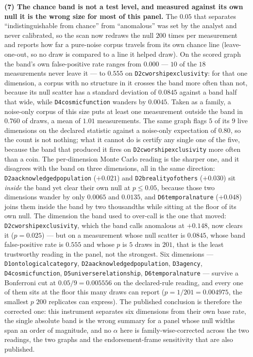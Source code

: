 \documentclass[11pt]{article}
\DeclareRobustCommand{\_}{\textunderscore\allowbreak}
\newcommand{\dimkey}[1]{\texttt{\small #1}}
\begin{document}
\textbf{(7) The chance band is not a test level, and measured against its own null it is the
wrong size for most of this panel.} The \(0.05\) that separates ``indistinguishable from
chance'' from ``anomalous'' was set by the analyst and never calibrated, so the scan now
redraws the null \(200\) times per measurement and reports how far a pure-noise corpus
travels from its own chance line (leave-one-out, so no draw is compared to a line it helped
draw). On the scored graph the band's own false-positive rate ranges from \(0.000\) ---
\(10\) of the \(18\) measurements never leave it --- to \(0.555\) on
\dimkey{D2c\_worship\_exclusivity}: for that one dimension, a corpus with no structure in it
crosses the band more often than not, because its null scatter has a standard deviation of
\(0.0845\) against a band half that wide, while \dimkey{D4\_cosmic\_function} wanders by
\(0.0045\). Taken as a family, a noise-only corpus of this size puts at
least one measurement outside the band in \(0.760\) of draws, a mean of \(1.01\) measurements.
The same graph flags \(5\) of its \(9\) live dimensions on the declared statistic against a
noise-only expectation of \(0.80\), so the count is not nothing; what it cannot do is certify
any single one of the five, because the band that produced it fires on
\dimkey{D2c\_worship\_exclusivity} more often than a coin.
The per-dimension Monte Carlo reading is the sharper one, and it disagrees with the band on
three dimensions, all in the same direction: \dimkey{D2a\_acknowledged\_population}
(\(+0.021\)) and \dimkey{D2b\_reality\_of\_others} (\(+0.030\)) sit \emph{inside} the band yet
clear their own null at \(p \le 0.05\), because those two dimensions wander by only \(0.0065\)
and \(0.0135\), and \dimkey{D6\_temporal\_nature} (\(+0.048\)) joins them inside the band by two
thousandths while sitting at the floor of its own null. The dimension the band used to over-call
is the one that moved: \dimkey{D2c\_worship\_exclusivity}, which the band calls anomalous at
\(+0.148\), now clears it (\(p = 0.025\)) --- but on a measurement whose null scatter is
\(0.0845\), whose band false-positive rate is \(0.555\) and whose \(p\) is \(5\) draws in \(201\),
that is the least trustworthy reading in the panel, not the strongest. Six dimensions --- \dimkey{D1\_ontological\_category},
\dimkey{D2a\_acknowledged\_population}, \dimkey{D3\_agency}, \dimkey{D4\_cosmic\_function},
\dimkey{D5\_universe\_relationship}, \dimkey{D6\_temporal\_nature} --- survive a Bonferroni cut
at \(0.05/9 = 0.005556\) on the declared-rule reading, and every one of them sits at the floor
this many draws can report (\(p = 1/201 = 0.004975\), the smallest \(p\) \(200\) replicates can
express). The published
conclusion is therefore the corrected one: this instrument separates six dimensions from their
own base rate, the single absolute band is the wrong summary for a panel whose null widths
span an order of magnitude, and no \(\alpha\) here is family-wise-corrected across the two
readings, the two graphs and the endorsement-frame sensitivity that are also published.
\end{document}
